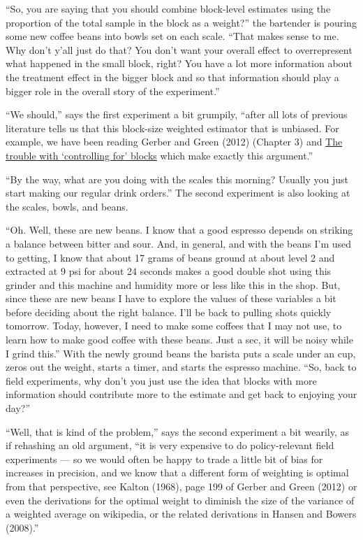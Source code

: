 \documentclass[
]{article}
\begin{document}
``So, you are saying that you should combine block-level estimates using the
proportion of the total sample in the block as a weight?'' the bartender is
pouring some new coffee beans into bowls set on each scale. ``That makes sense
to me. Why don't y'all just do that? You don't want your overall effect to
overrepresent what happened in the small block, right? You have a lot more
information about the treatment effect in the bigger block and so that
information should play a bigger role in the overall story of the experiment.''

``We should,'' says the first experiment a bit grumpily, ``after all lots of previous literature tells us that this block-size weighted estimator that is unbiased. For example, we have been reading Gerber and Green (2012) (Chapter 3) and \href{https://declaredesign.org/blog/biased-fixed-effects.html}{The trouble with `controlling for' blocks} which make exactly this argument.''

``By the way, what are you doing with the scales this morning? Usually you just start making our regular drink orders.'' The second experiment is also looking at the scales, bowls, and beans.

``Oh. Well, these are new beans. I know that a good espresso depends on striking a balance between bitter and sour. And, in general, and with the beans I'm used to getting, I know that about 17 grams of beans ground at about level 2 and extracted at 9 psi for about 24 seconds makes a good double shot using this grinder and this machine and humidity more or less like this in the shop. But, since these are new beans I have to explore the values of these variables a bit before deciding about the right balance. I'll be back to pulling shots quickly tomorrow. Today, however, I need to make some coffees that I may not use, to learn how to make good coffee with these beans. Just a sec, it will be noisy while I grind this.'' With the newly ground beans the barista puts a scale under an cup, zeros out the weight, starts a timer, and starts the espresso machine. ``So, back to field experiments, why don't you just use the idea that blocks with more information should contribute more to the estimate and get back to enjoying your day?''

``Well, that is kind of the problem,'' says the second experiment a bit wearily, as if rehashing an old argument, ``it is very expensive to do policy-relevant field experiments --- so we would often be happy to trade a little bit of bias for increases in precision, and we know that a different form of weighting is optimal from that perspective, see Kalton (1968), page 199 of Gerber and Green (2012) or even the derivations for the optimal weight to diminish the size of the variance of a weighted average on wikipedia, or the related derivations in Hansen and Bowers (2008).''
\end{document}
